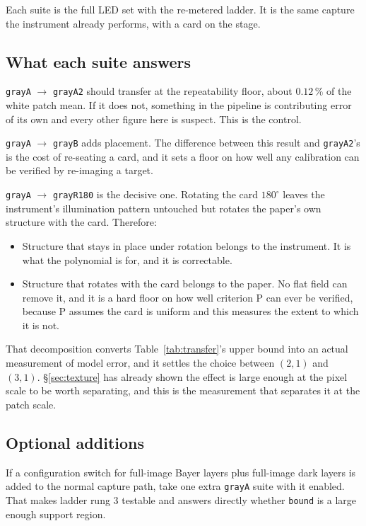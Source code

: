 \documentclass[11pt, a4paper]{article}
\newcommand{\code}[1]{\texttt{#1}}
\newcommand{\pct}{\,\%}
\begin{document}
Each suite is the full LED set with the re-metered ladder.
It is the same capture the instrument already performs,
with a card on the stage.

\subsection{What each suite answers}

\code{grayA} $\rightarrow$ \code{grayA2} should transfer
at the repeatability floor, about $0.12\pct$ of the white patch mean.
If it does not,
something in the pipeline is contributing error of its own
and every other figure here is suspect.
This is the control.

\code{grayA} $\rightarrow$ \code{grayB} adds placement.
The difference between this result and \code{grayA2}'s
is the cost of re-seating a card,
and it sets a floor on how well any calibration
can be verified by re-imaging a target.

\code{grayA} $\rightarrow$ \code{grayR180} is the decisive one.
Rotating the card $180^{\circ}$ leaves the instrument's illumination
pattern untouched
but rotates the paper's own structure with the card.
Therefore:

\begin{itemize}[nosep]
  \item Structure that stays in place under rotation
        belongs to the instrument.
        It is what the polynomial is for,
        and it is correctable.
  \item Structure that rotates with the card belongs to the paper.
        No flat field can remove it,
        and it is a hard floor on how well criterion P
        can ever be verified,
        because P assumes the card is uniform
        and this measures the extent to which it is not.
\end{itemize}

That decomposition converts Table~\ref{tab:transfer}'s upper bound
into an actual measurement of model error,
and it settles the choice between $(2,1)$ and $(3,1)$.
\S\ref{sec:texture} has already shown the effect is large enough
at the pixel scale to be worth separating,
and this is the measurement that separates it at the patch scale.

\subsection{Optional additions}

If a configuration switch for full-image Bayer layers
plus full-image dark layers is added to the normal capture path,
take one extra \code{grayA} suite with it enabled.
That makes ladder rung 3 testable
and answers directly whether \code{bound}
is a large enough support region.
\end{document}
